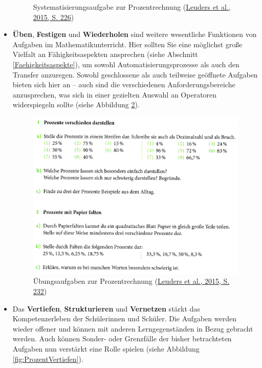 \documentclass[
]{scrbook}
\theoremstyle{definition}
\theoremstyle{definition}
\theoremstyle{definition}
\theoremstyle{definition}
\theoremstyle{remark}
\begin{document}
\begin{itemize}
\begin{figure}
{    }

    \caption{Systematisierungsaufgabe zur Prozentrechnung (\protect\hyperlink{ref-Barzel2015a}{Leuders et al., 2015, S. 226})}\label{fig:ProzentSammeln}
    \end{figure}
\item
  \textbf{Üben}, \textbf{Festigen} und \textbf{Wiederholen} sind weitere wesentliche Funktionen von Aufgaben im Mathematikunterricht. Hier sollten Sie eine möglichst große Vielfalt an Fähigkeitsaspekten ansprechen (siehe Abschnitt \ref{Faehigkeitsaspekte}), um sowohl Automatisierungsprozesse als auch den Transfer anzuregen. Sowohl geschlossene als auch teilweise geöffnete Aufgaben bieten sich hier an -- auch sind die verschiedenen Anforderungsbereiche anzusprechen, was sich in einer gezielten Auswahl an Operatoren widerspiegeln sollte (siehe Abbildung \ref{fig:ProzentUeben}).

  \begin{figure}

    {\centering \includegraphics[width=0.75\linewidth]{pictures/8-ProzentUeben} 

    }

    \caption{Übungsaufgaben zur Prozentrechnung (\protect\hyperlink{ref-Barzel2015a}{Leuders et al., 2015, S. 232})}\label{fig:ProzentUeben}
    \end{figure}
\item
  Das \textbf{Vertiefen}, \textbf{Strukturieren} und \textbf{Vernetzen} stärkt das Kompetenzerleben der Schülerinnen und Schüler. Die Aufgaben werden wieder offener und können mit anderen Lerngegenständen in Bezug gebracht werden. Auch können Sonder- oder Grenzfälle der bisher betrachteten Aufgaben nun verstärkt eine Rolle spielen (siehe Abbildung \ref{fig:ProzentVertiefen}).

  \begin{figure}


\end{figure}
\end{itemize}
\end{document}
